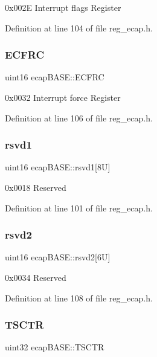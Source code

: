 0x002E Interrupt flags Register 

Definition at line 104 of file reg\+\_\+ecap.\+h.

\mbox{\label{structecapBASE_a0e89e6b9dc28759e72c90ac27d232f68}} 
\subsubsection{\texorpdfstring{E\+C\+F\+RC}{ECFRC}}
{\footnotesize\ttfamily uint16 ecap\+B\+A\+S\+E\+::\+E\+C\+F\+RC}

0x0032 Interrupt force Register 

Definition at line 106 of file reg\+\_\+ecap.\+h.

\mbox{\label{structecapBASE_ae082d4b14e1e70d3549b55c86716d724}} 
\subsubsection{\texorpdfstring{rsvd1}{rsvd1}}
{\footnotesize\ttfamily uint16 ecap\+B\+A\+S\+E\+::rsvd1\mbox{[}8\+U\mbox{]}}

0x0018 Reserved 

Definition at line 101 of file reg\+\_\+ecap.\+h.

\mbox{\label{structecapBASE_a2587e08a0ce761a5b5112a6f0c37fc3c}} 
\subsubsection{\texorpdfstring{rsvd2}{rsvd2}}
{\footnotesize\ttfamily uint16 ecap\+B\+A\+S\+E\+::rsvd2\mbox{[}6\+U\mbox{]}}

0x0034 Reserved 

Definition at line 108 of file reg\+\_\+ecap.\+h.

\mbox{\label{structecapBASE_af4dec4a7fa08794456ac2c4616c96176}} 
\subsubsection{\texorpdfstring{T\+S\+C\+TR}{TSCTR}}
{\footnotesize\ttfamily uint32 ecap\+B\+A\+S\+E\+::\+T\+S\+C\+TR}

